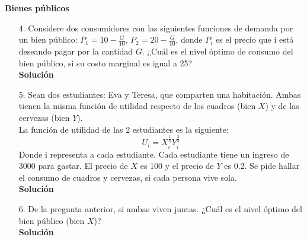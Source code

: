\documentclass[10pt,a4paper]{article}
\begin{document}
\textbf{\LARGE Bienes públicos}
	\begin{enumerate}
		\item [4.] Considere  dos consumidores con las siguientes funciones de demanda por un bien público: $P_{1}=10 - \frac{G}{10}$, $P_{2}= 20 - \frac{G}{10}$, donde $P_{i}$ es el precio que i está deseando pagar por la cantidad $G$. ¿Cuál es el nivel óptimo de consumo del bien público, si su costo marginal es igual a 25?\\
		
			\textbf{\large Solución}\\
				
		
		\item [5.] Sean dos estudiantes: Eva y Teresa, que comparten una habitación. Ambas tienen la misma función de utilidad respecto de los cuadros (bien $X$) y de las cervezas (bien $Y$).\\ 
		La función de utilidad de las 2 estudiantes es la siguiente:
			$$U_{i} = X^{\frac{1}{3}}_{i}Y^{\frac{2}{3}}_{i}$$
		Donde i representa a cada estudiante. Cada estudiante tiene un ingreso de 3000 para gastar. El precio de $X$ es 100 y el precio de $Y$ es 0.2. Se pide hallar el consumo de cuadros y cervezas, si cada persona vive sola.\\
			\textbf{\large Solución}\\
				
		
		\item [6.] De la pregunta anterior, si ambas viven juntas. ¿Cuál es el nivel óptimo del bien público (bien $X$)?\\
			\textbf{\large Solución}\\
				
	\end{enumerate}
\end{document}
